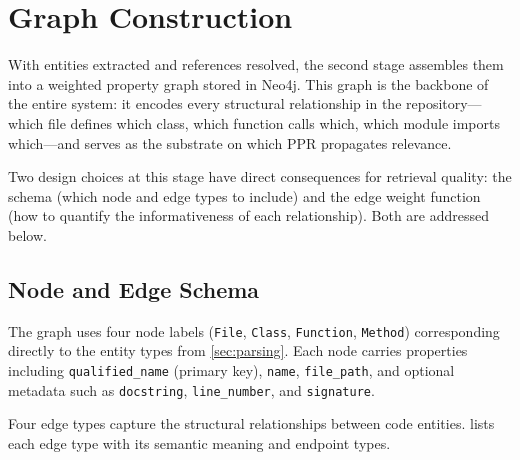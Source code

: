 \section{Graph Construction}
\label{sec:graph-construction}

With entities extracted and references resolved, the second stage assembles them into a weighted property graph stored in Neo4j. This graph is the backbone of the entire system: it encodes every structural relationship in the repository---which file defines which class, which function calls which, which module imports which---and serves as the substrate on which PPR propagates relevance.

Two design choices at this stage have direct consequences for retrieval quality: the schema (which node and edge types to include) and the edge weight function (how to quantify the informativeness of each relationship). Both are addressed below.

\subsection{Node and Edge Schema}
\label{sec:graph-schema}

The graph uses four node labels (\texttt{File}, \texttt{Class}, \texttt{Function}, \texttt{Method}) corresponding directly to the entity types from \cref{sec:parsing}. Each node carries properties including \texttt{qualified\_name} (primary key), \texttt{name}, \texttt{file\_path}, and optional metadata such as \texttt{docstring}, \texttt{line\_number}, and \texttt{signature}.

Four edge types capture the structural relationships between code entities.  lists each edge type with its semantic meaning and endpoint types.

